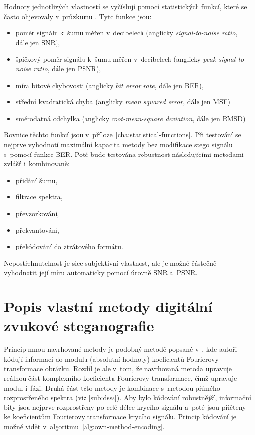 Hodnoty jednotlivých vlastností se vyčíslují pomocí statistických funkcí, které
se často objevovaly v~průzkumu \cite{AlSabhany2020}. Tyto funkce jsou:

\begin{itemize}
    \item poměr signálu k~šumu měřen v~decibelech (anglicky
        \textit{signal-to-noise ratio}, dále jen SNR),
    \item špičkový poměr signálu k~šumu měřen v~decibelech (anglicky
        \textit{peak signal-to-noise ratio}, dále jen PSNR),
    \item míra bitové chybovosti (anglicky \textit{bit error rate}, dále jen
        BER),
    \item střední kvadratická chyba (anglicky \textit{mean squared error}, dále
        jen MSE)
    \item směrodatná odchylka (anglicky \textit{root-mean-square deviation},
        dále jen RMSD)
\end{itemize}

Rovnice těchto funkcí jsou v~příloze~\ref{cha:statistical-functions}. Při
testování se nejprve vyhodnotí maximální kapacita metody bez modifikace stego
signálu s~pomocí funkce BER. Poté bude testována robustnost následujícími
metodami zvlášť i~kombinovaně:

\begin{itemize}
    \item přidání šumu,
    \item filtrace spektra,
    \item převzorkování,
    \item překvantování,
    \item překódování do ztrátového formátu.
\end{itemize}

Nepostřehnutelnost je sice subjektivní vlastnost, ale je možné částečně
vyhodnotit její míru automaticky pomocí úrovně SNR a~PSNR.

\section{Popis vlastní metody digitální zvukové steganografie}
\label{sec:own-method-proposal}

Princip mnou navrhované metody je podobný metodě popsané v~\cite{Ramkumar1999},
kde autoři kódují informaci do modulu (absolutní hodnoty) koeficientů
Fourierovy transformace obrázku. Rozdíl je ale v~tom, že navrhovaná metoda
upravuje reálnou část komplexního koeficientu Fourierovy transformace, čímž
upravuje modul i~fázi. Druhá část této metody je kombinace s~metodou přímého
rozprostřeného spektra (viz \ref{sub:dsss}). Aby bylo kódování robustnější,
informační bity jsou nejprve rozprostřeny po celé délce krycího signálu a~poté
jsou přičteny ke koeficientům Fourierovy transformace krycího signálu. Princip
kódování je možné vidět v~algoritmu~\ref{alg:own-method-encoding}.

